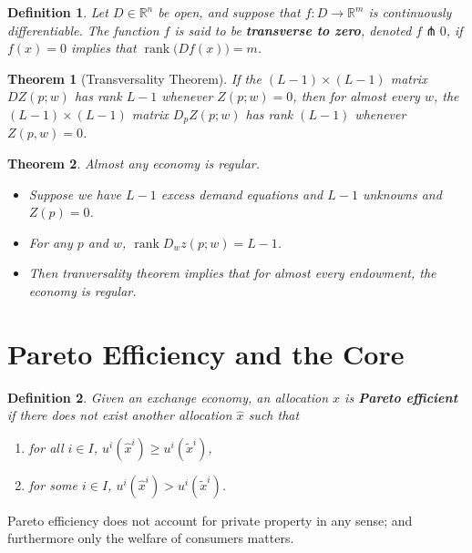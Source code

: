 \documentclass[11pt, twocolumn]{article}
\DeclareMathOperator{\rank}{rank}
\newcommand{\R}{\mathbb{R}}
\newtheorem{theorem}{Theorem}
\newtheorem{definition}{Definition}
\theoremstyle{definition}
\begin{document}
\begin{definition}
	Let $D \in \R^n$ be open, and suppose that $f:D \rightarrow \R^m$ is continuously differentiable. The function $f$ is said to be \textbf{transverse to zero}, denoted $ f \pitchfork 0$, if $f(x)=0$ implies that $\rank \big( Df(x) \big) = m$. 
\end{definition}

\begin{theorem}[Transversality Theorem]
	If the $(L-1) \times (L-1)$  matrix $DZ(p;w)$ has rank $L-1$ whenever $Z(p;w)=0$, then for almost every $w$, the $(L-1) \times (L-1)$ matrix $D_p Z(p;w)$ has rank $(L-1)$ whenever $Z(p,w)=0$. 
\end{theorem}

\begin{theorem}
	Almost any economy is regular. 
	\begin{itemize}
		\itemsep0em
		\item Suppose we have $L-1$ excess demand equations and $L-1$ unknowns and $Z(p)=0$. 
		\item For any $p$ and $w$, $\rank D_w z(p;w) = L-1$.
		\item Then tranversality theorem implies that for almost every endowment, the economy is regular. 
	\end{itemize}
\end{theorem}

\section*{Pareto Efficiency and the Core}

\begin{definition}
	Given an exchange economy, an allocation $x$ is \textbf{Pareto efficient} if there does not exist another allocation $\hat{x}$ such that
\begin{enumerate}[label=\roman*.]
	\item for all $i \in I$, $u^i(\hat{x}^i) \geq u^i(\tilde{x}^i) $,
	\item for some $i \in I$, $u^i(\hat{x}^i) > u^i(\tilde{x}^i) $.
	\end{enumerate}
\end{definition}
Pareto efficiency does not account for private property in any sense; and furthermore only the welfare of consumers matters. 
\end{document}
